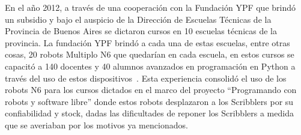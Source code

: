 En el año 2012, a través de una cooperación con la Fundación YPF que brindó
un subsidio y bajo el auspicio de la Dirección de Escuelas Técnicas de la
Provincia de Buenos Aires se dictaron cursos en 10 escuelas técnicas de la
provincia. La fundación YPF brindó a cada una de estas escuelas, entre otras
cosas, 20 robots Multiplo N6 que quedarían en cada escuela, en estos cursos
se capacitó a 140 docentes y 40 alumnos avanzados en programación en Python
a través del uso de estos dispositivos~\citep{diaz_aprendiendo_2012}.
Esta experiencia consolidó el uso de
los robots N6 para los cursos dictados en el marco del proyecto
``Programando con robots y software libre'' donde estos robots desplazaron
a los Scribblers por su confiabilidad y stock, dadas las dificultades de
reponer los Scribblers a medida que se averiaban por los motivos
ya mencionados.

